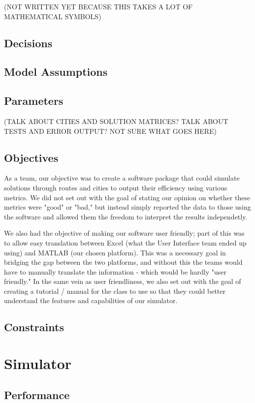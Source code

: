 \documentclass{article}
\begin{document}
(NOT WRITTEN YET BECAUSE THIS TAKES A LOT OF MATHEMATICAL SYMBOLS)

\subsection{Decisions}
\subsection{Model Assumptions}
\subsection{Parameters}

(TALK ABOUT CITIES AND SOLUTION MATRICES?  TALK ABOUT TESTS AND ERROR OUTPUT? NOT SURE WHAT GOES HERE)

\subsection{Objectives}

As a team, our objective was to create a software package that could simulate solutions through routes and cities to output their efficiency using various metrics.  We did not set out with the goal of stating our opinion on whether these metrics were "good" or "bad," but instead simply reported the data to those using the software and allowed them the freedom to interpret the results independetly. 

We also had the objective of making our software user friendly; part of this was to allow easy translation between Excel (what the User Interface team ended up using) and MATLAB (our chosen platform).  This was a necessary goal in bridging the gap between the two platforms, and without this the teams would have to manually translate the information - which would be hardly "user friendly."  In the same vein as user friendliness, we also set out with the goal of creating a tutorial / manual for the class to use so that they could better understand the features and capabilities of our simulator.


\subsection{Constraints}
\section{Simulator}
\subsection{Performance}
\end{document}

